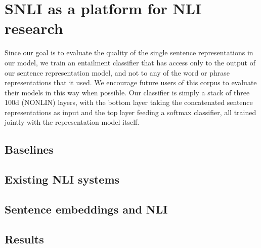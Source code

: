 \section{SNLI as a platform for NLI research}

Since our goal is to evaluate the quality of the single sentence representations in our model, we train an entailment classifier that has access only to the output of our sentence representation model, and not to any of the word or phrase representations that it used. We encourage future users of this corpus to evaluate their models in this way when possible. Our classifier is simply a stack of three 100d (NONLIN) layers, with the bottom layer taking the concatenated sentence representations as input and the top layer feeding a softmax classifier, all trained jointly with the representation model itself.

\subsection{Baselines}

\subsection{Existing NLI systems}

\subsection{Sentence embeddings and NLI}\label{sentence-embedding}



\subsection{Results}
